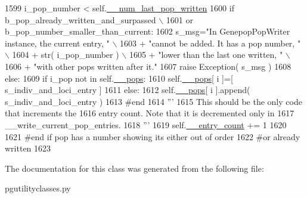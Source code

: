 \begin{DoxyCode}
1599                 i\_pop\_number < self.\hyperlink{classnegui_1_1pgutilityclasses_1_1GenepopPopWriter_ae11fb07e14cea411fd205f014cd75474}{\_\_num\_last\_pop\_written}
1600             \textcolor{keywordflow}{if} b\_pop\_already\_written\_and\_surpassed \(\backslash\)
1601                     \textcolor{keywordflow}{or} b\_pop\_number\_smaller\_than\_current:
1602                 s\_msg=\textcolor{stringliteral}{"In GenepopPopWriter instance, the current entry, "} \(\backslash\)
1603                             + \textcolor{stringliteral}{"cannot be added.  It has a pop number, "}  \(\backslash\)
1604                             + str( i\_pop\_number ) \(\backslash\)
1605                             + \textcolor{stringliteral}{"lower than the last one written,  "} \(\backslash\)
1606                             + \textcolor{stringliteral}{"with other pops written after it."}
1607                 \textcolor{keywordflow}{raise} Exception( s\_msg )
1608             \textcolor{keywordflow}{else}:
1609                 \textcolor{keywordflow}{if} i\_pop \textcolor{keywordflow}{not} \textcolor{keywordflow}{in} self.\hyperlink{classnegui_1_1pgutilityclasses_1_1GenepopPopWriter_afa7ef2e505b37a1dff9bb3479c356df8}{\_\_pops}:
1610                     self.\hyperlink{classnegui_1_1pgutilityclasses_1_1GenepopPopWriter_afa7ef2e505b37a1dff9bb3479c356df8}{\_\_pops}[ i ]=[ s\_indiv\_and\_loci\_entry ]
1611                 \textcolor{keywordflow}{else}:
1612                     self.\hyperlink{classnegui_1_1pgutilityclasses_1_1GenepopPopWriter_afa7ef2e505b37a1dff9bb3479c356df8}{\_\_pops}[ i ].append( s\_indiv\_and\_loci\_entry )
1613                 \textcolor{comment}{#end}
1614                 \textcolor{stringliteral}{'''}
1615 \textcolor{stringliteral}{                This should be the only code that increments the}
1616 \textcolor{stringliteral}{                entry count. Note that it is decremented only in}
1617 \textcolor{stringliteral}{                \_\_write\_current\_pop\_entries.}
1618 \textcolor{stringliteral}{                '''}
1619                 self.\hyperlink{classnegui_1_1pgutilityclasses_1_1GenepopPopWriter_a304e157063ad06904e141c994c5b514f}{\_\_entry\_count} += 1
1620                     
1621             \textcolor{comment}{#end if pop has a number showing its either out of order}
1622             \textcolor{comment}{#or already written}
1623 
\end{DoxyCode}


The documentation for this class was generated from the following file\+:\begin{DoxyCompactItemize}
\item 
pgutilityclasses.\+py\end{DoxyCompactItemize}
